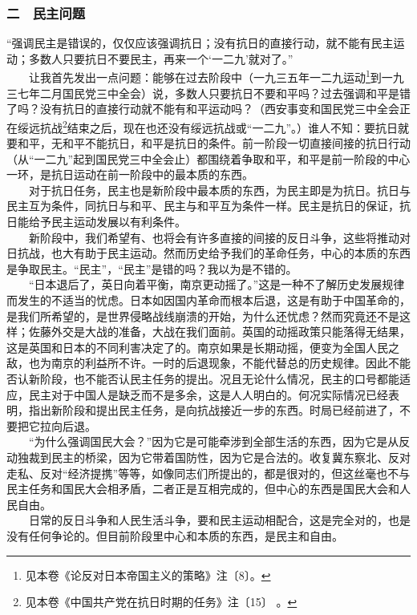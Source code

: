 \documentclass[cn,11pt,chinese]{elegantbook}
\def\myformat#1{\hfil\hfil #1}
\begin{document}
\subsubsection*{\myformat{二　民主问题 }}
“强调民主是错误的，仅仅应该强调抗日；没有抗日的直接行动，就不能有民主运动；多数人只要抗日不要民主，再来一个‘一二九’就对了。”\\
　　让我首先发出一点问题：能够在过去阶段中（一九三五年一二九运动\footnote[9]{ 见本卷《论反对日本帝国主义的策略》注〔8〕。}到一九三七年二月国民党三中全会）说，多数人只要抗日不要和平吗？过去强调和平是错了吗？没有抗日的直接行动就不能有和平运动吗？（西安事变和国民党三中全会正在绥远抗战\footnote[10]{ 见本卷《中国共产党在抗日时期的任务》注〔15〕 。}结束之后，现在也还没有绥远抗战或“一二九”。）谁人不知：要抗日就要和平，无和平不能抗日，和平是抗日的条件。前一阶段一切直接间接的抗日行动（从“一二九”起到国民党三中全会止）都围绕着争取和平，和平是前一阶段的中心一环，是抗日运动在前一阶段中的最本质的东西。\\
　　对于抗日任务，民主也是新阶段中最本质的东西，为民主即是为抗日。抗日与民主互为条件，同抗日与和平、民主与和平互为条件一样。民主是抗日的保证，抗日能给予民主运动发展以有利条件。\\
　　新阶段中，我们希望有、也将会有许多直接的间接的反日斗争，这些将推动对日抗战，也大有助于民主运动。然而历史给予我们的革命任务，中心的本质的东西是争取民主。“民主”，“民主”是错的吗？我以为是不错的。\\
　　“日本退后了，英日向着平衡，南京更动摇了。”这是一种不了解历史发展规律而发生的不适当的忧虑。日本如因国内革命而根本后退，这是有助于中国革命的，是我们所希望的，是世界侵略战线崩溃的开始，为什么还忧虑？然而究竟还不是这样；佐藤外交是大战的准备，大战在我们面前。英国的动摇政策只能落得无结果，这是英国和日本的不同利害决定了的。南京如果是长期动摇，便变为全国人民之敌，也为南京的利益所不许。一时的后退现象，不能代替总的历史规律。因此不能否认新阶段，也不能否认民主任务的提出。况且无论什么情况，民主的口号都能适应，民主对于中国人是缺乏而不是多余，这是人人明白的。何况实际情况已经表明，指出新阶段和提出民主任务，是向抗战接近一步的东西。时局已经前进了，不要把它拉向后退。\\
　　“为什么强调国民大会？”因为它是可能牵涉到全部生活的东西，因为它是从反动独裁到民主的桥梁，因为它带着国防性，因为它是合法的。收复冀东察北、反对走私、反对“经济提携”等等，如像同志们所提出的，都是很对的，但这丝毫也不与民主任务和国民大会相矛盾，二者正是互相完成的，但中心的东西是国民大会和人民自由。\\
　　日常的反日斗争和人民生活斗争，要和民主运动相配合，这是完全对的，也是没有任何争论的。但目前阶段里中心和本质的东西，是民主和自由。\\
\end{document}
